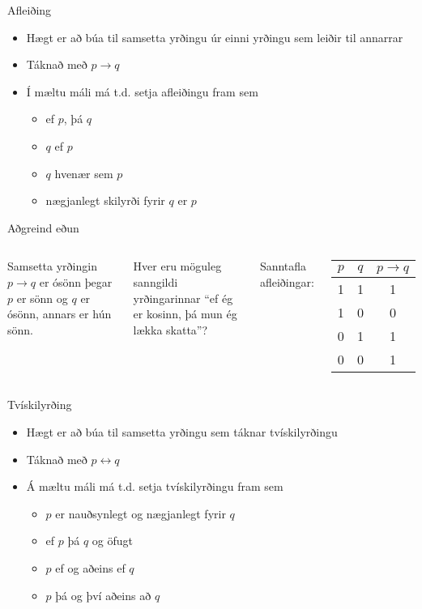 \documentclass[handout]{beamer}
\begin{document}
\begin{frame}{Afleiðing}
\begin{itemize}
 \item Hægt er að búa til samsetta yrðingu úr einni yrðingu sem leiðir til annarrar
 \item Táknað með $p \to q$
 \item Í mæltu máli má t.d. setja afleiðingu fram sem
 \begin{itemize}
  \item ef $p$, þá $q$
  \item $q$ ef $p$
  \item $q$ hvenær sem $p$
  \item nægjanlegt skilyrði fyrir $q$ er $p$
 \end{itemize}
\end{itemize}
\end{frame}

\begin{frame}{Aðgreind eðun}
\begin{columns}
Samsetta yrðingin $p \to q$ er ósönn þegar $p$ er sönn og $q$ er ósönn, annars er hún sönn.

\vspace*{0.5cm}

Hver eru möguleg sanngildi yrðingarinnar ``ef ég er kosinn, þá mun ég lækka skatta''?

Sanntafla afleiðingar:
\begin{center}
\begin{tabular}{ccc}
\toprule
$p$&$q$&$p \to q$ \\
\midrule
1&1&1\\
1&0&0\\
0&1&1\\
0&0&1\\
\bottomrule
\end{tabular}
\end{center}
\end{columns}
\end{frame}

\begin{frame}{Tvískilyrðing}
\begin{itemize}
 \item Hægt er að búa til samsetta yrðingu sem táknar tvískilyrðingu
 \item Táknað með $p \leftrightarrow q$
 \item Á mæltu máli má t.d. setja tvískilyrðingu fram sem
 \begin{itemize}
  \item $p$ er nauðsynlegt og nægjanlegt fyrir $q$
  \item ef $p$ þá $q$ og öfugt
  \item $p$ ef og aðeins ef $q$
  \item $p$ þá og því aðeins að $q$
 \end{itemize}
\end{itemize}
\end{frame}
\end{document}
